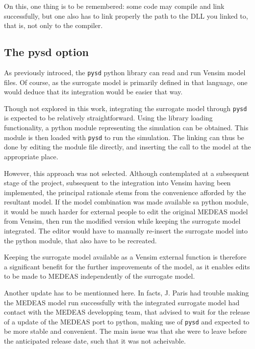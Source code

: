 On this, one thing is to be remembered: some code may compile and link successfully, but one also has to link properly the path to the DLL you linked to, that is, not only to the compiler.

\subsection{The pysd option}

As previously introced, the \texttt{pysd} python library can read and run Vensim model files. Of course, as the surrogate model is primarily defined in that language, one would deduce that its integration would be easier that way.

Though not explored in this work, integrating the surrogate model through \texttt{pysd} is expected to be relatively straightforward. Using the library loading functionality, a python module representing the simulation can be obtained. This module is then loaded with \texttt{pysd} to run the simulation. The linking can thus be done by editing the module file directly, and inserting the call to the model at the appropriate place. 

However, this approach was not selected. Although contemplated at a subsequent stage of the project, subsequent to the integration into Vensim having been implemented, the principal rationale stems from the convenience afforded by the resultant model. If the model combination was made available sa python module, it would be much harder for external people to edit the original MEDEAS model from Vensim, then run the modified version while keeping the surrogate model integrated. The editor would have to manually re-insert the surrogate model into the python module, that also have to be recreated.

Keeping the surrogate model available as a Vensim external function is therefore a significant benefit for the further improvements of the model, as it enables edits to be made to MEDEAS independently of the surrogate model.

Another update has to be mentionned here. In facts, J. Paris had trouble making the MEDEAS model run successfully with the integrated surrogate model had contact with the MEDEAS developping team, that advised to wait for the release of a update of the MEDEAS port to python, making use of \texttt{pysd} and expected to be more stable and convenient. The main issue was that she were to leave before the anticipated release date, such that it was not acheivable.

